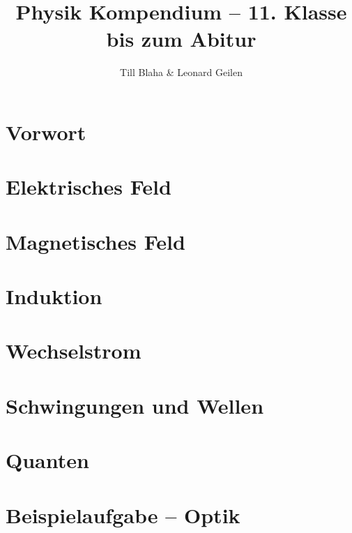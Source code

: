 \documentclass[a5paper, 9pt, twoside]{book}
\title{Physik Kompendium -- 11. Klasse bis zum Abitur}
\author{Till Blaha \& Leonard Geilen}
\begin{document}
\maketitle

\tableofcontents
\newpage

\chapter*{Vorwort}




\chapter{Elektrisches Feld}


\chapter{Magnetisches Feld}


\chapter{Induktion}


\chapter{Wechselstrom}


\chapter{Schwingungen und Wellen}


\chapter{Quanten}


\appendix

	\chapter{Beispielaufgabe -- Optik}
	
\end{document}
